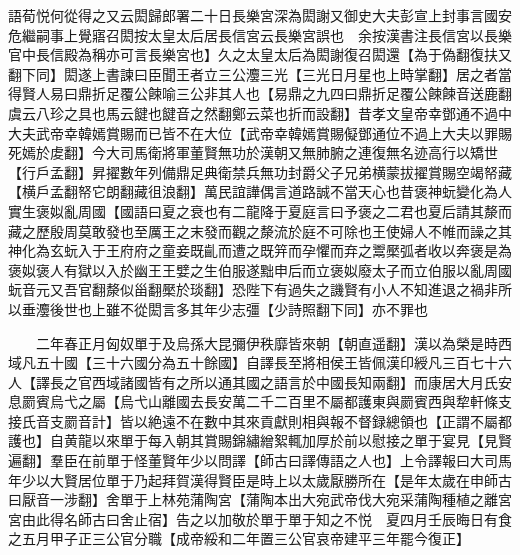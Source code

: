 語荀悦何從得之又云閎歸郎署二十日長樂宮深為閎謝又御史大夫彭宣上封事言國安危繼嗣事上覺寤召閎按太皇太后居長信宮云長樂宮誤也　余按漢書注長信宮以長樂官中長信殿為稱亦可言長樂宮也】久之太皇太后為閎謝復召閎還【為于偽翻復扶又翻下同】閎遂上書諫曰臣聞王者立三公灋三光【三光日月星也上時掌翻】居之者當得賢人易曰鼎折足覆公餗喻三公非其人也【易鼎之九四曰鼎折足覆公餗餗音送鹿翻虞云八珍之具也馬云䭈也䭈音之然翻鄭云菜也折而設翻】昔孝文皇帝幸鄧通不過中大夫武帝幸韓嫣賞賜而已皆不在大位【武帝幸韓嫣賞賜儗鄧通位不過上大夫以罪賜死嫣於䖍翻】今大司馬衛將軍董賢無功於漢朝又無肺腑之連復無名迹高行以矯世【行戶孟翻】昇擢數年列備鼎足典衛禁兵無功封爵父子兄弟横蒙拔擢賞賜空竭帑藏【横戶孟翻帑它朗翻藏徂浪翻】萬民誼譁偶言道路誠不當天心也昔褒神蚖變化為人實生褒姒亂周國【國語曰夏之衰也有二龍降于夏庭言曰予褒之二君也夏后請其漦而藏之歷殷周莫敢發也至厲王之末發而觀之漦流於庭不可除也王使婦人不帷而譟之其神化為玄蚖入于王府府之童妾既齓而遭之既笄而孕懼而弃之鬻檿弧者收以奔褒是為褒姒褒人有獄以入於幽王王嬖之生伯服遂黜申后而立褒姒廢太子而立伯服以亂周國蚖音元又吾官翻漦似甾翻檿於琰翻】恐陛下有過失之譏賢有小人不知進退之禍非所以垂灋後世也上雖不從閎言多其年少志彊【少詩照翻下同】亦不罪也

　　二年春正月匈奴單于及烏孫大昆彌伊秩靡皆來朝【朝直遥翻】漢以為榮是時西域凡五十國【三十六國分為五十餘國】自譯長至將相侯王皆佩漢印綬凡三百七十六人【譯長之官西域諸國皆有之所以通其國之語言於中國長知兩翻】而康居大月氏安息罽賓烏弋之屬【烏弋山離國去長安萬二千二百里不屬都護東與罽賓西與犂軒條支接氏音支罽音計】皆以絶遠不在數中其來貢獻則相與報不督録總領也【正謂不屬都護也】自黄龍以來單于每入朝其賞賜錦繡繒絮輒加厚於前以慰接之單于宴見【見賢遍翻】羣臣在前單于怪董賢年少以問譯【師古曰譯傳語之人也】上令譯報曰大司馬年少以大賢居位單于乃起拜賀漢得賢臣是時上以太歲厭勝所在【是年太歲在申師古曰厭音一涉翻】舍單于上林苑蒲陶宮【蒲陶本出大宛武帝伐大宛采蒲陶種植之離宮宮由此得名師古曰舍止宿】告之以加敬於單于單于知之不悦　夏四月壬辰晦日有食之五月甲子正三公官分職【成帝綏和二年置三公官哀帝建平三年罷今復正】

